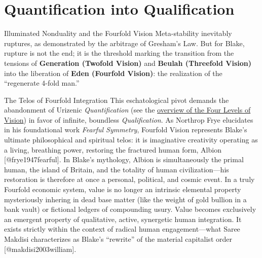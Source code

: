 \documentclass[
  ignorenonframetext,
]{beamer}
\author{\texorpdfstring{}{}}
\date{}
\begin{document}
\section{Quantification into
Qualification}\label{quantification-into-qualification}

\begin{frame}{Illuminated Nonduality and the Fourfold Vision}
\protect{}\label{illuminated-nonduality-and-the-fourfold-vision}
Meta-stability inevitably ruptures, as demonstrated by the arbitrage of
Gresham's Law. But for Blake, rupture is not the end; it is the
threshold marking the transition from the tensions of \textbf{Generation
(Twofold Vision)} and \textbf{Beulah (Threefold Vision)} into the
liberation of \textbf{Eden (Fourfold Vision)}: the realization of the
``regenerate 4-fold man.''

\begin{block}{The Telos of Fourfold Integration}
\protect{}\label{the-telos-of-fourfold-integration}
This eschatological pivot demands the abandonment of Urizenic
\emph{Quantification} (see the
\href{03b_los_and_fourfold_vision.md\#the-four-levels-of-monetary-vision-and-generation}{overview
of the Four Levels of Vision}) in favor of infinite, boundless
\emph{Qualification}. As Northrop Frye elucidates in his foundational
work \emph{Fearful Symmetry}, Fourfold Vision represents Blake's
ultimate philosophical and spiritual telos: it is imaginative creativity
operating as a living, breathing power, restoring the fractured human
form, Albion {[}@frye1947fearful{]}. In Blake's mythology, Albion is
simultaneously the primal human, the island of Britain, and the totality
of human civilization---his restoration is therefore at once a personal,
political, and cosmic event. In a truly Fourfold economic system, value
is no longer an intrinsic elemental property mysteriously inhering in
dead base matter (like the weight of gold bullion in a bank vault) or
fictional ledgers of compounding usury. Value becomes exclusively an
emergent property of qualitative, active, synergetic human integration.
It exists strictly within the context of radical human engagement---what
Saree Makdisi characterizes as Blake's ``rewrite'' of the material
capitalist order {[}@makdisi2003william{]}.
\end{block}


\end{frame}
\end{document}
